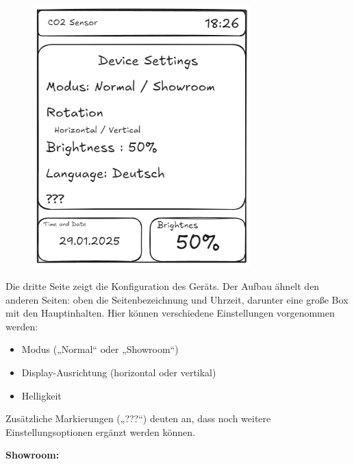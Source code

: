 \begin{inhalt}
\begin{figure}[!htb]
\centering
\includegraphics[width=0.75\textwidth]{files/Tobias/pics/Skizzen/Screen3_Settings.png}
\caption[Display Interface Skizze (Seite 3)]{}
\label{fig:display_skizze_seite_3}
\end{figure}

Die dritte Seite zeigt die Konfiguration des Geräts. Der Aufbau ähnelt den anderen Seiten: oben die Seitenbezeichnung und Uhrzeit, darunter eine große Box mit den Hauptinhalten. Hier können verschiedene Einstellungen vorgenommen werden:

\begin{itemize}
    \item Modus („Normal“ oder „Showroom“)
    \item Display-Ausrichtung (horizontal oder vertikal)
    \item Helligkeit
\end{itemize}

Zusätzliche Markierungen („???“) deuten an, dass noch weitere Einstellungsoptionen ergänzt werden können.

\begin{center}
    \textbf{Showroom:}
\end{center}

\smallskip


\end{inhalt}
